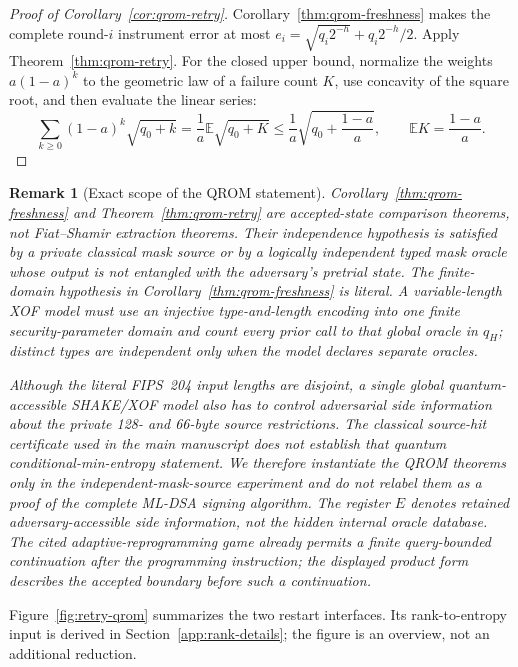 \documentclass[pdflatex,sn-mathphys-num]{sn-jnl}
\theoremstyle{thmstyleone}
\theoremstyle{thmstyletwo}
\newtheorem{remark}[theorem]{Remark}
\newcommand{\E}{\mathbb E}
\begin{document}
\begin{proof}[Proof of Corollary~\ref{cor:qrom-retry}]
Corollary~\ref{thm:qrom-freshness} makes the complete round-$i$ instrument error
at most
$e_i=\sqrt{q_i2^{-h}}+q_i2^{-h}/2$.  Apply
Theorem~\ref{thm:qrom-retry}.  For the closed upper bound, normalize the
weights $a(1-a)^k$ to the geometric law of a failure count $K$, use concavity
of the square root, and then evaluate the linear series:
\[
 \sum_{k\ge0}(1-a)^k\sqrt{q_0+k}
 =\frac1a\E\sqrt{q_0+K}
 \le\frac1a\sqrt{q_0+\frac{1-a}{a}},
 \qquad
 \E K=\frac{1-a}{a}.
\]
\end{proof}

\begin{remark}[Exact scope of the QROM statement]
\label{rem:qrom-scope}
Corollary~\ref{thm:qrom-freshness} and Theorem~\ref{thm:qrom-retry} are
accepted-state comparison theorems, not Fiat--Shamir extraction theorems.
Their independence hypothesis is satisfied by a private classical mask source
or by a logically independent typed mask oracle whose output is not entangled
with the adversary's pretrial state.  The finite-domain hypothesis in
Corollary~\ref{thm:qrom-freshness} is literal.  A variable-length XOF model
must use an injective type-and-length encoding into one finite
security-parameter domain and count every prior call to that global oracle in
$q_H$; distinct types are independent only when the model declares separate
oracles.

Although the literal FIPS~204 input lengths are disjoint, a single global
quantum-accessible SHAKE/XOF model also has to control adversarial side
information about the private 128- and 66-byte source restrictions.  The
classical source-hit certificate used in the main manuscript does not
establish that quantum conditional-min-entropy statement.  We therefore instantiate the
QROM theorems only in the independent-mask-source experiment and do not
relabel them as a proof of the complete ML-DSA signing algorithm.  The register
$E$ denotes retained adversary-accessible side information, not the hidden
internal oracle database.  The cited adaptive-reprogramming game already
permits a finite query-bounded continuation after the programming instruction;
the displayed product form describes the accepted boundary before such a
continuation.
\end{remark}

Figure~\ref{fig:retry-qrom} summarizes the two restart interfaces.  Its
rank-to-entropy input is derived in Section~\ref{app:rank-details}; the figure
is an overview, not an additional reduction.
\end{document}
